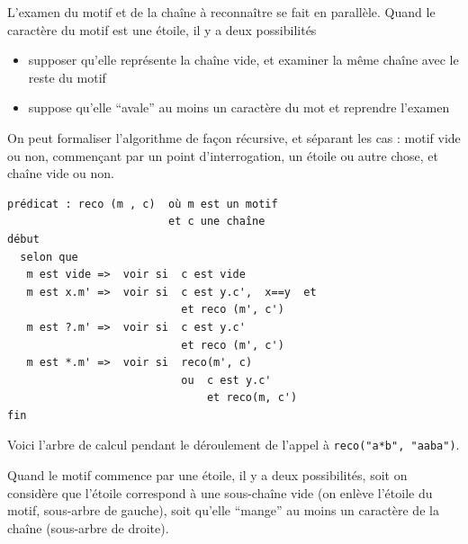 \documentclass[10pt,twoside]{article}
\begin{document}
L'examen du motif et de la chaîne à reconnaître se fait en parallèle.
Quand le caractère du motif est une étoile, il y a deux possibilités
\begin{itemize}
\item supposer qu'elle représente la chaîne vide, et examiner la même chaîne
avec le reste du motif
\item suppose qu'elle ``avale'' au moins un caractère du mot et reprendre
l'examen
\end{itemize}

On peut formaliser l'algorithme de façon récursive, et séparant les cas : motif
vide ou non, commençant par un point d'interrogation, un étoile ou autre chose,
et chaîne vide ou non.

\begin{lstlisting}
prédicat : reco (m , c)  où m est un motif
                         et c une chaîne
début
  selon que
   m est vide =>  voir si  c est vide 
   m est x.m' =>  voir si  c est y.c',  x==y  et
                           et reco (m', c')
   m est ?.m' =>  voir si  c est y.c'
                           et reco (m', c')
   m est *.m' =>  voir si  reco(m', c) 
                           ou  c est y.c'
                               et reco(m, c')
fin
\end{lstlisting}


Voici l'arbre de calcul pendant le déroulement de l'appel à
\texttt{reco("a*b", "aaba")}. 

Quand le motif commence par une étoile, 
il y a deux possibilités, soit on considère que l'étoile correspond
à une sous-chaîne vide (on enlève l'étoile du motif, sous-arbre de gauche),
 soit qu'elle 
``mange'' au moins un caractère de la chaîne (sous-arbre de droite).
\end{document}
